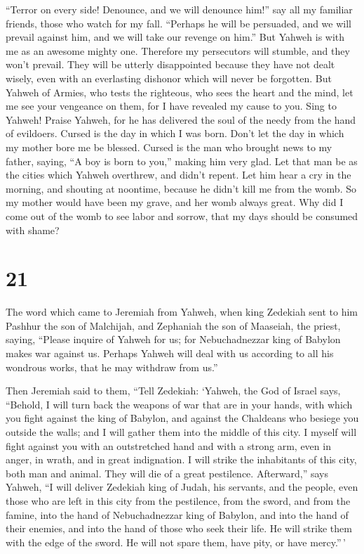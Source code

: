 ``Terror on every side! Denounce, and we will denounce him!'' say all my
familiar friends, those who watch for my fall. ``Perhaps he will be
persuaded, and we will prevail against him, and we will take our revenge
on him.''  But Yahweh is with me as an awesome mighty
one. Therefore my persecutors will stumble, and they won't prevail. They
will be utterly disappointed because they have not dealt wisely, even
with an everlasting dishonor which will never be forgotten.
 But Yahweh of Armies, who tests the righteous, who sees
the heart and the mind, let me see your vengeance on them, for I have
revealed my cause to you.  Sing to Yahweh! Praise Yahweh,
for he has delivered the soul of the needy from the hand of evildoers.
 Cursed is the day in which I was born. Don't let the day
in which my mother bore me be blessed.  Cursed is the man
who brought news to my father, saying, ``A boy is born to you,'' making
him very glad.  Let that man be as the cities which
Yahweh overthrew, and didn't repent. Let him hear a cry in the morning,
and shouting at noontime,  because he didn't kill me from
the womb. So my mother would have been my grave, and her womb always
great.  Why did I come out of the womb to see labor and
sorrow, that my days should be consumed with shame?

\hypertarget{section-20}{%
\section{21}\label{section-20}}

 The word which came to Jeremiah from Yahweh, when king
Zedekiah sent to him Pashhur the son of Malchijah, and Zephaniah the son
of Maaseiah, the priest, saying,  ``Please inquire of
Yahweh for us; for Nebuchadnezzar king of Babylon makes war against us.
Perhaps Yahweh will deal with us according to all his wondrous works,
that he may withdraw from us.''

 Then Jeremiah said to them, ``Tell Zedekiah:
 `Yahweh, the God of Israel says, ``Behold, I will turn
back the weapons of war that are in your hands, with which you fight
against the king of Babylon, and against the Chaldeans who besiege you
outside the walls; and I will gather them into the middle of this city.
 I myself will fight against you with an outstretched hand
and with a strong arm, even in anger, in wrath, and in great
indignation.  I will strike the inhabitants of this city,
both man and animal. They will die of a great pestilence. 
Afterward,'' says Yahweh, ``I will deliver Zedekiah king of Judah, his
servants, and the people, even those who are left in this city from the
pestilence, from the sword, and from the famine, into the hand of
Nebuchadnezzar king of Babylon, and into the hand of their enemies, and
into the hand of those who seek their life. He will strike them with the
edge of the sword. He will not spare them, have pity, or have
mercy.''\,'

